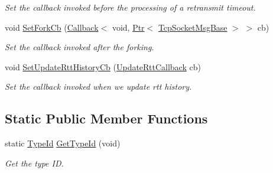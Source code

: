 \begin{DoxyCompactItemize}
\begin{DoxyCompactList}\small\item\em Set the callback invoked before the processing of a retransmit timeout. \end{DoxyCompactList}\item 
void \hyperlink{classns3_1_1TcpSocketMsgBase_a2a1dda342f60b37e429874aa660464db}{Set\+Fork\+Cb} (\hyperlink{classns3_1_1Callback}{Callback}$<$ void, \hyperlink{classns3_1_1Ptr}{Ptr}$<$ \hyperlink{classns3_1_1TcpSocketMsgBase}{Tcp\+Socket\+Msg\+Base} $>$ $>$ cb)
\begin{DoxyCompactList}\small\item\em Set the callback invoked after the forking. \end{DoxyCompactList}\item 
void \hyperlink{classns3_1_1TcpSocketMsgBase_affd21caababe0680f6b7abc2452a3ed0}{Set\+Update\+Rtt\+History\+Cb} (\hyperlink{classns3_1_1TcpSocketMsgBase_ab7f20ba80824e33974a46f48dd3de7b7}{Update\+Rtt\+Callback} cb)
\begin{DoxyCompactList}\small\item\em Set the callback invoked when we update rtt history. \end{DoxyCompactList}\end{DoxyCompactItemize}
\subsection*{Static Public Member Functions}
\begin{DoxyCompactItemize}
\item 
static \hyperlink{classns3_1_1TypeId}{Type\+Id} \hyperlink{classns3_1_1TcpSocketMsgBase_af797e9d4d4f7e84d45378c9efaa8b8e7}{Get\+Type\+Id} (void)
\begin{DoxyCompactList}\small\item\em Get the type ID. \end{DoxyCompactList}\end{DoxyCompactItemize}
